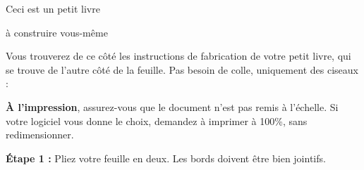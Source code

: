 \documentclass[a4paper,12pt]{article}
\begin{document}
\begin{center}
  {\Huge Ceci est un petit livre}

  {\Large à construire vous-même}
\end{center}

\large

Vous trouverez de ce côté les instructions de fabrication de votre
petit livre, qui se trouve de l'autre côté de la feuille. Pas besoin
de colle, uniquement des ciseaux :

\bigskip\bigskip

\noindent\textbf{À l'impression}, assurez-vous que le document n'est
pas remis à l'échelle. Si votre logiciel vous donne le choix, demandez
à imprimer à 100\%, sans redimensionner.

\medskip
\noindent\textbf{Étape 1 :} Pliez votre feuille en deux.
Les bords doivent être bien jointifs.
\end{document}
